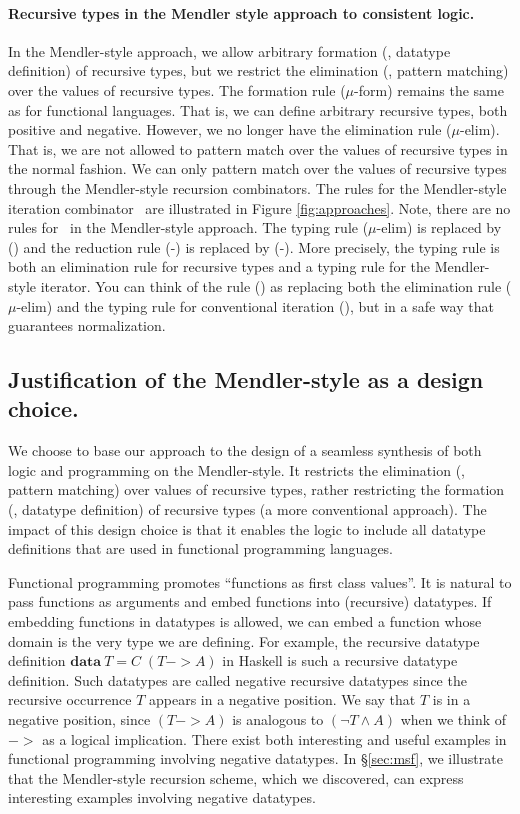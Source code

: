 \paragraph{Recursive types in the Mendler style approach to consistent logic.}
In the Mendler-style approach, we allow arbitrary formation
(\ie, datatype definition) of recursive types, but we restrict
the elimination (\ie, pattern matching) over the values of recursive types. 
The formation rule {\small($\mu$-form)} remains the same as
for functional languages. That is, we can define arbitrary recursive types,
both positive and negative. However, we no longer have the elimination
rule {\small($\mu$-elim)}. That is, we are not allowed to pattern match over
the values of recursive types in the normal fashion. We can only pattern match
over the values of recursive types through the Mendler-style recursion
combinators. The rules for the Mendler-style iteration combinator \MIt\
are illustrated in Figure \ref{fig:approaches}.
Note, there are no rules for \unIn\ in the Mendler-style approach.
The typing rule {\small($\mu$-elim)} is replaced by {\small(\MIt)} and
the reduction rule {\small(\unIn-\In)} is replaced by {\small(\MIt-\In)}.
More precisely, the typing rule {\small \MIt} is both an elimination rule
for recursive types and a typing rule for the Mendler-style iterator.
You can think of the rule {\small(\MIt)} as replacing both the elimination rule
{\small($\mu$-elim)} and the typing rule for conventional iteration
{\small(\It)}, but in a safe way that guarantees normalization.

\subsection{Justification of the Mendler-style as a design choice.}
\label{sec:intro:concepts:mendler}
We choose to base our approach to the design of a seamless synthesis of both
logic and programming on the Mendler-style. It restricts the elimination (\ie,
pattern matching) over values of recursive types, rather restricting the
formation (\ie, datatype definition) of recursive types (a more conventional
approach). The impact of this design choice is that it enables the logic to
include all datatype definitions that are used in functional programming
languages.

Functional programming promotes ``functions as first class values''.
It is natural to pass functions as arguments and embed functions into
(recursive) datatypes. If embedding functions in datatypes is allowed,
we can embed a function whose domain is the very type we are defining.
For example, the recursive datatype definition
$\mathbf{data}~T = C\;(T -> \textit{A})$ in Haskell is such a recursive
datatype definition. Such datatypes are called negative recursive datatypes
since the recursive occurrence $T$ appears in a negative position.
We say that $T$ is in a negative position, since $(T -> A)$ is analogous to
$(\neg T \land A)$ when we think of $->$ as a logical implication. There exist
both interesting and useful examples in functional programming involving
negative datatypes. In \S\ref{sec:msf}, we illustrate that
the Mendler-style recursion scheme, which we discovered, can express
interesting examples involving negative datatypes.

